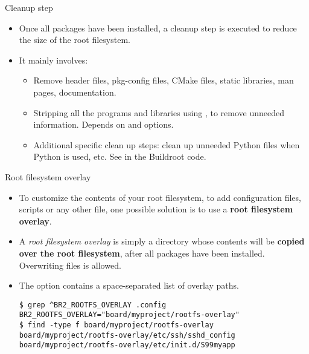 \begin{frame}{Cleanup step}
  \begin{itemize}
  \item Once all packages have been installed, a cleanup step is
    executed to reduce the size of the root filesystem.
  \item It mainly involves:
    \begin{itemize}
    \item Remove header files, pkg-config files, CMake files, static
      libraries, man pages, documentation.
    \item Stripping all the programs and libraries using ,
      to remove unneeded information. Depends on
       and  options.
    \item Additional specific clean up steps: clean up unneeded Python
      files when Python is used, etc. See 
      in the Buildroot code.
    \end{itemize}
  \end{itemize}
\end{frame}

\begin{frame}[fragile]{Root filesystem overlay}

  \begin{itemize}

  \item To customize the contents of your root filesystem, to add
    configuration files, scripts or any other file, one possible
    solution is to use a {\bf root filesystem overlay}.

  \item A {\em root filesystem overlay} is simply a directory whose
    contents will be {\bf copied over the root filesystem}, after all
    packages have been installed. Overwriting files is allowed.

  \item The option  contains a
    space-separated list of overlay paths.

\begin{block}{}
{\small
\begin{verbatim}
$ grep ^BR2_ROOTFS_OVERLAY .config
BR2_ROOTFS_OVERLAY="board/myproject/rootfs-overlay"
$ find -type f board/myproject/rootfs-overlay
board/myproject/rootfs-overlay/etc/ssh/sshd_config
board/myproject/rootfs-overlay/etc/init.d/S99myapp
\end{verbatim}}
\end{block}

  \end{itemize}

\end{frame}

